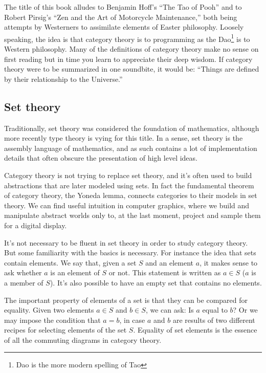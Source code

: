 \documentclass[11pt, book]{memoir}
\begin{document}
The title of this book alludes to Benjamin Hoff's ``The Tao of Pooh'' and to Robert Pirsig's ``Zen and the Art of Motorcycle Maintenance,'' both being attempts by Westerners to assimilate elements of Easter philosophy. Loosely speaking, the idea is that category theory is to programming as the Dao\footnote{Dao is the more modern spelling of Tao} is to Western philosophy. Many of the definitions of category theory make no sense on first reading but in time you learn to appreciate their deep wisdom. If category theory were to be summarized in one soundbite, it would be: ``Things are defined by their relationship to the Universe.'' 

\subsection{Set theory}

Traditionally, set theory was considered the foundation of mathematics, although more recently type theory is vying for this title. In a sense, set theory is the assembly language of mathematics, and as such contains a lot of implementation details that often obscure  the presentation of high level ideas. 

Category theory is not trying to replace set theory, and it's often used to build abstractions that are later modeled using sets. In fact the fundamental theorem of category theory, the Yoneda lemma, connects categories to their models in set theory. We can find useful intuition in computer graphics, where we build and manipulate abstract worlds only to, at the last moment, project and sample them for a digital display.

It's not necessary to be fluent in set theory in order to study category theory. But some familiarity with the basics is necessary. For instance the idea that sets contain elements. We say that, given a set $S$ and an element $a$, it makes sense to ask whether $a$ is an element of $S$ or not. This statement is written as $a \in S$ ($a$ is a member of $S$). It's also possible to have an empty set that contains no elements. 

The important property of elements of a set is that they can be compared for equality. Given two elements $a \in S$ and $b \in S$, we can ask: Is $a$ equal to $b$? Or we may impose the condition that $a = b$, in case $a$ and $b$ are results of two different recipes for selecting elements of the set $S$. Equality of set elements is the essence of all the commuting diagrams in category theory.
\end{document}
